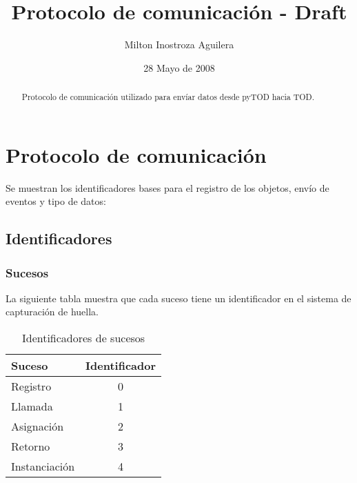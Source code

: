 \documentclass[10pt,a4paper]{article}
\begin{document}
\renewcommand{\contentsname}{Indice} 
\renewcommand\listfigurename{Lista de Figuras}
\renewcommand\listtablename{Lista de Tablas}
\newcommand\bibname{Bibliografía}
\renewcommand{\refname}{Bibliografía}
\renewcommand\indexname{Indice alfabético}
\renewcommand\figurename{Figura}
\renewcommand\tablename{Tabla}
\renewcommand\partname{Parte}
\newcommand\chaptername{Capítulo}
\renewcommand\appendixname{Apéndice}
\renewcommand\abstractname{Resumen}

\title{Protocolo de comunicación - Draft}
\author{Milton Inostroza Aguilera}
\date{28 Mayo de 2008}
\clearpage
\maketitle

\begin{abstract}

Protocolo de comunicación utilizado para envíar datos desde pyTOD hacia TOD.

\end{abstract}

\newpage
\tableofcontents
\newpage
\listoftables
\newpage

\section{Protocolo de comunicación}

Se muestran los identificadores bases para el registro de los objetos, envío de eventos y tipo de datos:

\subsection{Identificadores}

\subsubsection{Sucesos}

La siguiente tabla muestra que cada suceso tiene un identificador en el sistema de capturación de huella.
\begin{table}[!h]
\begin{center}
\begin{tabular}{|l | c |}
\hline
Suceso & Identificador\\
\hline
Registro & 0\\
\hline
Llamada & 1\\
\hline
Asignación & 2\\
\hline
Retorno & 3\\
\hline
Instanciación & 4\\
\hline
\end{tabular}
\caption{Identificadores de sucesos} 
\end{center}
\end{table}
\end{document}
